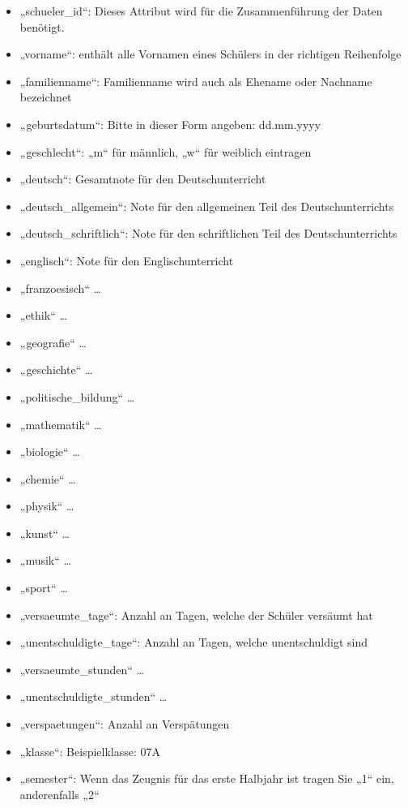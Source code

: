 \documentclass[a4paper,10pt]{scrartcl}
\begin{document}
      \begin{itemize}
         \item „schueler\_id“: Dieses Attribut wird für die Zusammenführung der Daten benötigt.
         \item „vorname“: enthält alle Vornamen eines Schülers in der richtigen Reihenfolge
         \item „familienname“: Familienname wird auch als Ehename oder Nachname bezeichnet
         \item „geburtsdatum“: Bitte in dieser Form angeben: dd.mm.yyyy
         \item „geschlecht“: „m“ für männlich, „w“ für weiblich eintragen
         \item „deutsch“: Gesamtnote für den Deutschunterricht
         \item „deutsch\_allgemein“: Note für den allgemeinen Teil des Deutschunterrichts
         \item „deutsch\_schriftlich“: Note für den schriftlichen Teil des Deutschunterrichts
         \item „englisch“: Note für den Englischunterricht
         \item „franzoesisch“ …
         \item „ethik“ …
         \item „geografie“ …
         \item „geschichte“ …
         \item „politische\_bildung“ …
         \item „mathematik“ …
         \item „biologie“ …
         \item „chemie“ …
         \item „physik“ …
         \item „kunst“ …
	 \item „musik“ …
         \item „sport“ …
         \item „versaeumte\_tage“: Anzahl an Tagen, welche der Schüler versäumt hat
         \item „unentschuldigte\_tage“: Anzahl an Tagen, welche unentschuldigt sind
         \item „versaeumte\_stunden“ …
         \item „unentschuldigte\_stunden“ …
         \item „verspaetungen“: Anzahl an Verspätungen
         \item „klasse“: Beispielklasse: 07A
         \item „semester“: Wenn das Zeugnis für das erste Halbjahr ist tragen Sie „1“ ein, anderenfalls „2“

\end{itemize}
\end{document}
